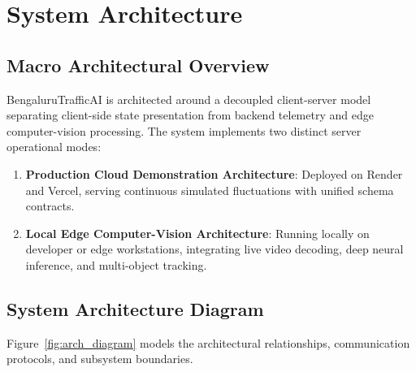 \chapter{System Architecture}

\section{Macro Architectural Overview}
BengaluruTrafficAI is architected around a decoupled client-server model separating client-side state presentation from backend telemetry and edge computer-vision processing. The system implements two distinct server operational modes:
\begin{enumerate}
    \item \textbf{Production Cloud Demonstration Architecture}: Deployed on Render and Vercel, serving continuous simulated fluctuations with unified schema contracts.
    \item \textbf{Local Edge Computer-Vision Architecture}: Running locally on developer or edge workstations, integrating live video decoding, deep neural inference, and multi-object tracking.
\end{enumerate}

\section{System Architecture Diagram}
Figure~\ref{fig:arch_diagram} models the architectural relationships, communication protocols, and subsystem boundaries.

